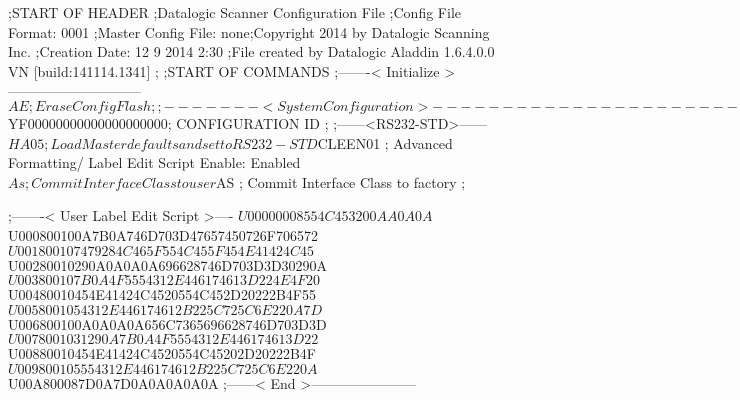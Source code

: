 ;START OF HEADER
;Datalogic Scanner Configuration File
;Config File Format: 0001
;Master Config File: none;Copyright 2014 by Datalogic Scanning Inc.
;Creation Date: 12 9 2014 2:30
;File created by Datalogic Aladdin 1.6.4.0.0 VN [build:141114.1341]
;
;START OF COMMANDS
;-------< Initialize >-----------------------------
$AE                 ; Erase Config Flash
;
;-------< System Configuration >-------------------------------
$YF00000000000000000000; CONFIGURATION ID
;
;------<RS232-STD>------
$HA05               ; Load Master defaults and set to RS232-STD
$CLEEN01            ; Advanced Formatting/ Label Edit Script Enable: Enabled
$As                 ; Commit Interface Class to user
$AS                 ; Commit Interface Class to factory
;

;-------< User Label Edit Script >----
$U00000008554C453200AA0A0A
$U000800100A7B0A746D703D47657450726F706572
$U001800107479284C465F554C455F454E41424C45
$U00280010290A0A0A0A696628746D703D3D30290A
$U003800107B0A4F5554312E446174613D224E4F20
$U00480010454E41424C4520554C452D20222B4F55
$U0058001054312E446174612B225C725C6E220A7D
$U006800100A0A0A0A656C7365696628746D703D3D
$U0078001031290A7B0A4F5554312E446174613D22
$U00880010454E41424C4520554C45202D20222B4F
$U009800105554312E446174612B225C725C6E220A
$U00A800087D0A7D0A0A0A0A0A
;------< End >-----------------------
